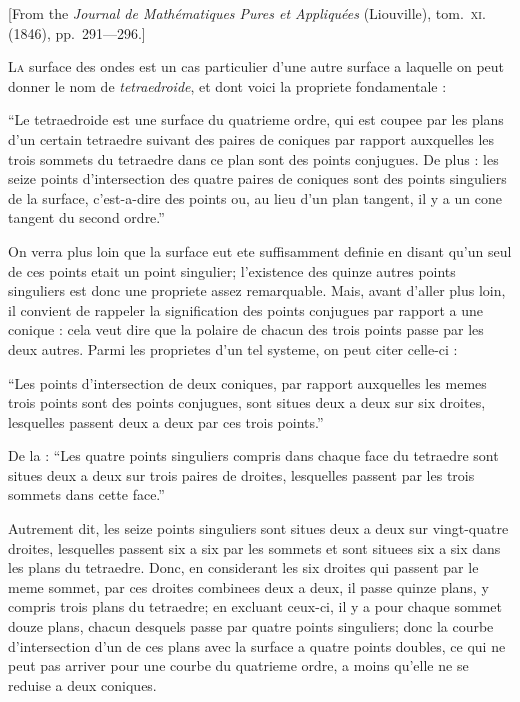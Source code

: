 \documentclass[11pt,a4paper]{book}
\begin{document}
[From the \textit{Journal de Math\'ematiques Pures et Appliqu\'ees} (Liouville), tom.~\textsc{xi}. (1846), pp.~291---296.]

\bigskip

\textsc{La} surface des ondes est un cas particulier d'une autre surface a laquelle on peut donner le nom de \textit{tetraedroide}, et dont voici la propriete fondamentale :

``Le tetraedroide est une surface du quatrieme ordre, qui est coupee par les plans d'un certain tetraedre suivant des paires de coniques par rapport auxquelles les trois sommets du tetraedre dans ce plan sont des points conjugues. De plus : les seize points d'intersection des quatre paires de coniques sont des points singuliers de la surface, c'est-a-dire des points ou, au lieu d'un plan tangent, il y a un cone tangent du second ordre.''

On verra plus loin que la surface eut ete suffisamment definie en disant qu'un seul de ces points etait un point singulier; l'existence des quinze autres points singuliers est donc une propriete assez remarquable. Mais, avant d'aller plus loin, il convient de rappeler la signification des points conjugues par rapport a une conique : cela veut dire que la polaire de chacun des trois points passe par les deux autres. Parmi les proprietes d'un tel systeme, on peut citer celle-ci :

``Les points d'intersection de deux coniques, par rapport auxquelles les memes trois points sont des points conjugues, sont situes deux a deux sur six droites, lesquelles passent deux a deux par ces trois points.''

De la : ``Les quatre points singuliers compris dans chaque face du tetraedre sont situes deux a deux sur trois paires de droites, lesquelles passent par les trois sommets dans cette face.''

Autrement dit, les seize points singuliers sont situes deux a deux sur vingt-quatre droites, lesquelles passent six a six par les sommets et sont situees six a six dans les plans du tetraedre. Donc, en considerant les six droites qui passent par le meme sommet, par ces droites combinees deux a deux, il passe quinze plans, y compris trois plans du tetraedre; en excluant ceux-ci, il y a pour chaque sommet douze plans, chacun desquels passe par quatre points singuliers; donc la courbe d'intersection d'un de ces plans avec la surface a quatre points doubles, ce qui ne peut pas arriver pour une courbe du quatrieme ordre, a moins qu'elle ne se reduise a deux coniques.
\end{document}
